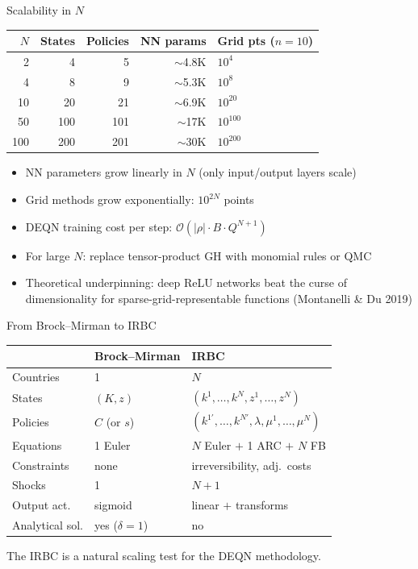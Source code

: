 \documentclass[aspectratio=169,11pt]{beamer}
\newcommand{\emphc}[1]{\textcolor{harvardcrimson}{#1}}
\begin{document}
\begin{frame}{Scalability in $N$}
\begin{center}
\begin{tabular}{rrrrl}
\toprule
$N$ & \textbf{States} & \textbf{Policies} & \textbf{NN params} & \textbf{Grid pts ($n\!=\!10$)} \\
\midrule
2 & 4 & 5 & $\sim$4.8K & $10^4$ \\
4 & 8 & 9 & $\sim$5.3K & $10^8$ \\
10 & 20 & 21 & $\sim$6.9K & $10^{20}$ \\
50 & 100 & 101 & $\sim$17K & $10^{100}$ \\
100 & 200 & 201 & $\sim$30K & $10^{200}$ \\
\bottomrule
\end{tabular}
\end{center}

\vspace{0.5em}
\begin{itemize}
    \item NN parameters grow \emphc{linearly} in $N$ (only input/output layers scale)
    \item Grid methods grow \emphc{exponentially}: $10^{2N}$ points
    \item DEQN training cost per step: $\mathcal{O}(|\rho| \cdot B \cdot Q^{N+1})$
    \item For large $N$: replace tensor-product GH with monomial rules or QMC
    \item Theoretical underpinning: \emphc{deep ReLU networks} beat the curse of dimensionality for sparse-grid-representable functions (Montanelli \& Du 2019)
\end{itemize}
\end{frame}

\begin{frame}{From Brock--Mirman to IRBC}
\begin{center}
\begin{tabular}{lll}
\toprule
& \textbf{Brock--Mirman} & \textbf{IRBC} \\
\midrule
Countries & 1 & $N$ \\
States & $(K, z)$ & $(k^1, \ldots, k^N, z^1, \ldots, z^N)$ \\
Policies & $C$ (or $s$) & $(k^{1\prime}, \ldots, k^{N\prime}, \lambda, \mu^1, \ldots, \mu^N)$ \\
Equations & 1 Euler & $N$ Euler $+$ 1 ARC $+$ $N$ FB \\
Constraints & none & irreversibility, adj.\ costs \\
Shocks & 1 & $N+1$ \\
Output act. & sigmoid & linear $+$ transforms \\
Analytical sol. & yes ($\delta=1$) & no \\
\bottomrule
\end{tabular}
\end{center}

\vspace{0.3em}
{\small The IRBC is a natural \emphc{scaling test} for the DEQN methodology.}
\end{frame}
\end{document}
